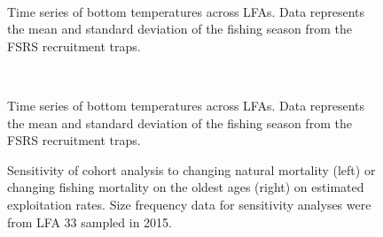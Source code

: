 \begin{landscape}
\begin{figure}
        \centering
         \\
                    
                    \caption{Time series of bottom temperatures across LFAs. Data represents the mean and standard deviation of the fishing season from the FSRS recruitment traps.}
        \end{figure}

\begin{figure}
        \centering
         \\
                    
                    \caption{Time series of bottom temperatures across LFAs. Data represents the mean and standard deviation of the fishing season from the FSRS recruitment traps.}
        \end{figure}

\end{landscape}




\begin{figure}
\centering
              \caption{Sensitivity of cohort analysis to changing natural mortality (left) or changing fishing mortality on the oldest ages (right) on estimated exploitation rates. Size frequency data for sensitivity analyses were from LFA 33 sampled in 2015.}
\end{figure}


